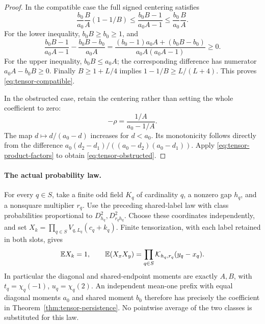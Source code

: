 \documentclass[11pt]{article}
\begin{document}
\begin{proof}
In the compatible case the full signed centering satisfies
\[
 \frac{b_0}{a_0}\frac BA(1-1/B)
 \le \frac{b_0B-1}{a_0A-1}
 \le \frac{b_0}{a_0}\frac BA .
\]
For the lower inequality, \(b_0B\ge b_0\ge1\), and
\[
 \frac{b_0B-1}{a_0A-1}-\frac{b_0B-b_0}{a_0A}
 =\frac{(b_0-1)a_0A+(b_0B-b_0)}
        {a_0A(a_0A-1)}\ge0.
\]
For the upper inequality, \(b_0B\le a_0A\); the corresponding
difference has numerator \(a_0A-b_0B\ge0\).
Finally \(B\ge1+L/4\) implies \(1-1/B\ge L/(L+4)\).
This proves \eqref{eq:tensor-compatible}.

In the obstructed case, retain the centering rather than setting the
whole coefficient to zero:
\[
 -\rho=\frac{1/A}{a_0-1/A}.
\]
The map \(d\mapsto d/(a_0-d)\) increases for \(d<a_0\).
Its monotonicity follows directly from the difference
\(a_0(d_2-d_1)/((a_0-d_2)(a_0-d_1))\).
Apply \eqref{eq:tensor-product-factors} to obtain
\eqref{eq:tensor-obstructed}.
\end{proof}

\paragraph{The actual probability law.}
For every \(q\in S\), take a finite odd field \(K_q\) of cardinality \(q\),
a nonzero gap \(h_q\), and a nonsquare multiplier \(r_q\).
Use the preceding shared-label law with class probabilities proportional
to \(D_{h_q}^2,D_{r_qh_q}^2\). Choose these coordinates independently,
and set \(X_k=\prod_{q\in S}V_{q,L_q}(c_q+k_q)\).
Finite tensorization, with each label retained in both slots, gives
\[
 \mathbb E X_k=1,\qquad
 \mathbb E(X_xX_y)=\prod_{q\in S}{\cal K}_{h_q,r_q}(y_q-x_q).
\]
In particular the diagonal and shared-endpoint moments are exactly
\(A,B\), with \(t_q=\chi_q(-1)\), \(u_q=\chi_q(2)\).
An independent mean-one prefix with equal diagonal moments \(a_0\)
and shared moment \(b_0\) therefore has precisely the coefficient
in Theorem~\ref{thm:tensor-persistence}.
No pointwise average of the two classes is substituted for this law.
\end{document}
